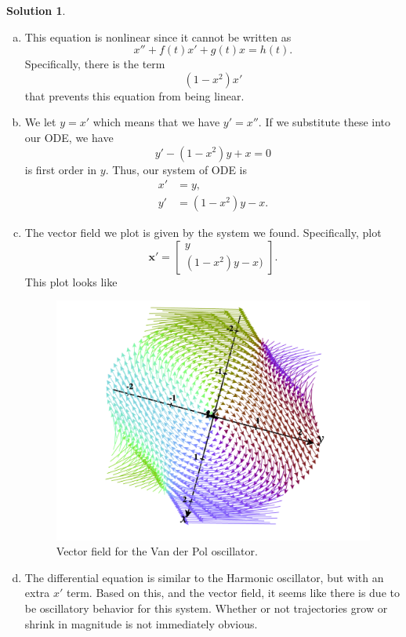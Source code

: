 \documentclass[12pt]{report} %
\theoremstyle{definition}
\newtheorem{solution}{Solution}
\begin{document}
\begin{solution}~
\begin{enumerate}[(a)]
    \item This equation is nonlinear since it cannot be written as
    \[
    x''+f(t)x'+g(t)x=h(t).
    \]
    Specifically, there is the term 
    \[
    (1-x^2)x'
    \]
    that prevents this equation from being linear.
    \item We let $y=x'$ which means that we have $y'=x''$.  If we substitute these into our ODE, we have
    \[
    y'-(1-x^2)y+x=0
    \]
    is first order in $y$.  Thus, our system of ODE is
    \begin{align}
        x'&=y,\\
        y'&=(1-x^2)y-x.
    \end{align}
    \item The vector field we plot is given by the system we found. Specifically, plot
    \[
    \mathbf{x}' = \begin{bmatrix} y\\ (1-x^2)y-x) \end{bmatrix}.
    \]
    This plot looks like
    \begin{figure}[H]
        \centering
        \includegraphics[width=.5\textwidth]{Images/vanderpol.png}
        \caption{Vector field for the Van der Pol oscillator.}
    \end{figure}
    \item The differential equation is similar to the Harmonic oscillator, but with an extra $x'$ term.  Based on this, and the vector field, it seems like there is due to be oscillatory behavior for this system.  Whether or not trajectories grow or shrink in magnitude is not immediately obvious.
\end{enumerate}
\end{solution}
\vspace*{.5cm}
\end{document}
